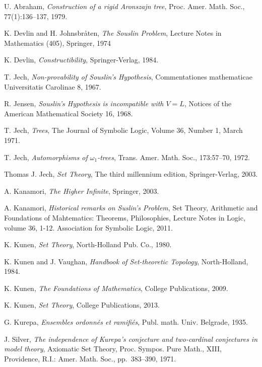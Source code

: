 \documentclass[11pt,a4paper]{report}
\theoremstyle{definition}
\theoremstyle{num.custom-title}
\theoremstyle{custom-title}
\begin{document}
\begin{thebibliography}{9}

U. Abraham, \emph{Construction of a rigid Aronszajn tree}, Proc. Amer. Math. Soc., 77(1):136–137, 1979.

K. Devlin and H. Johnsbråten, \emph{The Souslin Problem}, Lecture Notes in Mathematics (405), Springer, 1974

K. Devlin, \emph{Constructibility}, Springer-Verlag, 1984.

T. Jech, \emph{Non-provability of Souslin's Hypothesis}, Commentationes mathematicae Universitatis Carolinae 8, 1967.

R. Jensen, \emph{Souslin's Hypothesis is incompatible with $V = L$}, Notices of the American Mathematical Society 16, 1968.

T. Jech, \emph{Trees}, The Journal of Symbolic Logic, Volume 36, Number 1, March 1971.

T. Jech, \emph{Automorphisms of $\omega_1$-trees}, Trans. Amer. Math. Soc., 173:57–70, 1972.

Thomas J. Jech, \emph{Set Theory}, The third millennium edition, Springer-Verlag, 2003.

A. Kanamori, \emph{The Higher Infinite}, Springer, 2003.

A. Kanamori, \emph{Historical remarks on Suslin's Problem}, Set Theory, Arithmetic and Foundations of Mahtematics: Theorems, Philosophies, Lecture Notes in Logic, volume 36, 1-12. Association for Symbolic Logic, 2011.

K. Kunen, \emph{Set Theory}, North-Holland Pub. Co., 1980.

K. Kunen and J. Vaughan, \emph{Handbook of Set-theoretic Topology}, North-Holland, 1984.

K. Kunen, \emph{The Foundations of Mathematics}, College Publications, 2009.

K. Kunen, \emph{Set Theory}, College Publications, 2013.

G. Kurepa, \emph{Ensembles ordonnés et ramifiés}, Publ. math. Univ. Belgrade, 1935.

J. Silver, \emph{The independence of Kurepa's conjecture and two-cardinal conjectures in model theory}, Axiomatic Set Theory, Proc. Sympos. Pure Math., XIII, Providence, R.I.: Amer. Math. Soc., pp.\ 383--390, 1971.


\end{thebibliography}
\end{document}
